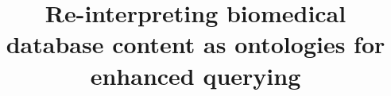 \documentclass{bmcart}
\begin{document}
\begin{frontmatter}

\begin{fmbox}


\title{Re-interpreting biomedical database content as ontologies for enhanced querying}


\author[
   addressref={aff1},                   %
   corref={aff1},                       %
   noteref={n1},                        %
   email={fss3@cin.ufpe.br}   %
]{ }
\author[
addressref={aff2},                   %
noteref={n1},                        %
email={robert.hoehndorf@kaust.edu.sa}   %
]{ }
\author[
addressref={aff1},                   %
noteref={n1},                        %
]{ }
\author[
addressref={aff3},                   %
noteref={n1},                        %
email={stefan.schulz@medunigraz.at}   %
]{ }



\end{fmbox}
\end{frontmatter}
\end{document}
